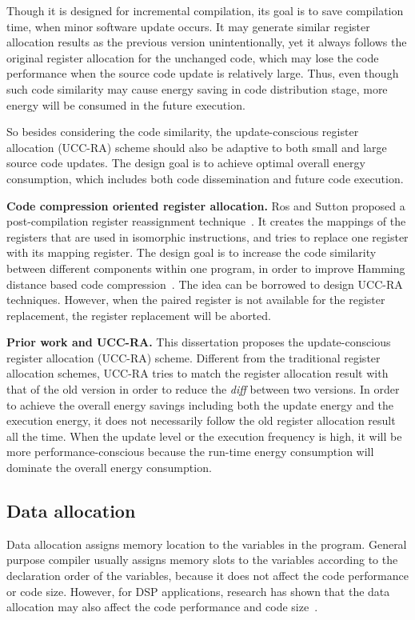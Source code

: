 Though it is designed for incremental compilation, its goal is to save compilation time, when minor software update 
occurs. It may generate similar register allocation results as the previous version unintentionally, yet it always 
follows the original register allocation for the unchanged code, which may lose the code performance when the source 
code update is relatively large. Thus, even though such code similarity may cause energy saving in code distribution 
stage, more energy will be consumed in the future execution.

So besides considering the code similarity, the update-conscious register allocation (UCC-RA) scheme should also be 
adaptive to both small and large source code updates. The design goal is to achieve optimal overall energy consumption, 
which includes both code dissemination and future code execution. 	

\textbf{Code compression oriented register allocation.}
Ros and Sutton proposed a post-compilation register reassignment technique~\cite{related:register-reassignment}. It 
creates the mappings of the registers that are used in isomorphic instructions, and tries to replace one register with 
its mapping register. The design goal is to increase the code similarity between different components within one 
program, in order to improve Hamming distance based code compression~\cite{hamming-compress}. 
The idea can be borrowed to design UCC-RA techniques. However, when the paired register is not available for the 
register replacement, the register replacement will be aborted. 

\textbf{Prior work and UCC-RA.}
This dissertation proposes the update-conscious register allocation (UCC-RA) scheme.
Different from the traditional register allocation schemes, UCC-RA tries to match the register allocation result with 
that of the old version in order to reduce the {\it diff} between two versions.
In order to achieve the overall energy savings including both the update energy and the execution energy, it does not 
necessarily follow the old register allocation result all the time. When the update level or the execution frequency is 
high, it will be more performance-conscious because the run-time energy consumption will dominate the overall energy 
consumption.


\subsection{Data allocation}
Data allocation assigns memory location to the variables in the program. General purpose compiler usually assigns 
memory slots to the variables according to the declaration order of the variables, because it does not affect the code 
performance or code size. However, for DSP applications, research has shown that the data allocation may also affect 
the code performance and code size~\cite{related:liao, related:bartley}.

